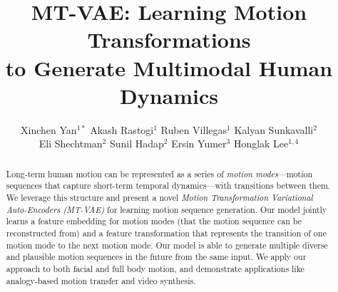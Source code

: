 \documentclass[runningheads]{llncs}
\newcommand{\cutabstractup}{\vspace*{-0.2in}}
\newcommand{\cutabstractdown}{\vspace*{-0.2in}}
\newcommand{\cutsectionup}{\vspace*{-0.2in}}
\begin{document}
\title{MT-VAE: Learning Motion Transformations \\ to Generate Multimodal Human Dynamics}




\author{
  Xinchen Yan$^{1*}$ \quad Akash Rastogi$^1$ \quad Ruben Villegas$^1$ \quad Kalyan Sunkavalli$^2$\\ 
  Eli Shechtman$^2$ \quad
  Sunil Hadap$^2$ \quad Ersin Yumer$^3$ \quad Honglak Lee$^{1,4}$\\
}




\maketitle              

\begin{abstract}
\cutabstractup
Long-term human motion can be represented as a series of \emph{motion modes}---motion sequences that capture short-term temporal dynamics---with transitions between them.
We leverage this structure and present a novel \emph{Motion Transformation Variational Auto-Encoders (MT-VAE)} for learning motion sequence generation.
Our model jointly learns a feature embedding for motion modes (that the motion sequence can be reconstructed from) and a feature transformation that represents the transition of one motion mode to the next motion mode.
Our model is able to generate multiple diverse and plausible motion sequences in the future from the same input.
We apply our approach to both facial and full body motion, and demonstrate applications like analogy-based motion transfer and video synthesis.
\cutabstractdown
\end{abstract}

\cutsectionup
\end{document}
